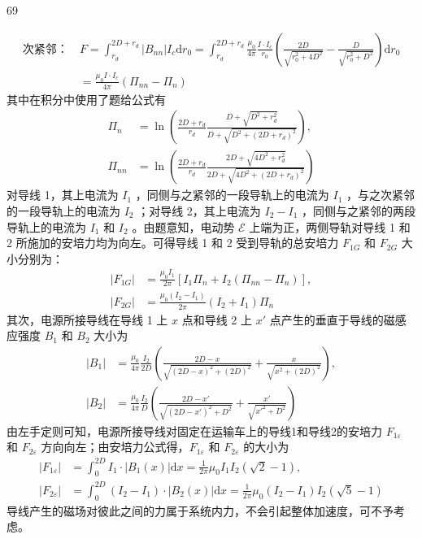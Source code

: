 \begin{solution}{69}
\begin{subsolution}
\begin{align}
            \text{次紧邻：} &\ F = \int_{r_{d}}^{2D+r_{d}} |B_{nn}| I_{c} \mathrm{d}r_{0} = \int_{r_{d}}^{2D+r_{d}} \frac{\mu_{0}}{4\pi} \frac{I \cdot I_{c}}{r_{0}} \left( \frac{2D}{\sqrt{r_{0}^{2} + 4D^{2}}} - \frac{D}{\sqrt{r_{0}^{2} + D^{2}}} \right) \mathrm{d}r_{0} \nonumber \\
            &\ = \frac{\mu_{0} I \cdot I_{c}}{4\pi} (\Pi_{nn} - \Pi_{n}) \label{eq:16.p69}
        \end{align}
        其中在积分中使用了题给公式有
        \begin{align}
            \Pi_{n} &= \ln\left( \frac{2D + r_{d}}{r_{d}} \frac{D + \sqrt{D^{2} + r_{d}^{2}}}{D + \sqrt{D^{2} + (2D + r_{d})^{2}}} \right), \nonumber \\
            \Pi_{nn} &= \ln\left( \frac{2D + r_{d}}{r_{d}} \frac{2D + \sqrt{4D^{2} + r_{d}^{2}}}{2D + \sqrt{4D^{2} + (2D + r_{d})^{2}}} \right)
        \end{align}
        对导线 1，其上电流为 $I_{1}$ ，同侧与之紧邻的一段导轨上的电流为 $I_{1}$ ，与之次紧邻的一段导轨上的电流为 $I_{2}$ ；对导线 2，其上电流为 $I_{2}-I_{1}$ ，同侧与之紧邻的两段导轨上的电流为 $I_{1}$ 和 $I_{2}$ 。由题意知，电动势 $\mathcal{E}$ 上端为正，两侧导轨对导线 1 和 2 所施加的安培力均为向左。可得导线 1 和 2 受到导轨的总安培力 $F_{1G}$ 和 $F_{2G}$ 大小分别为：
        \begin{align}
            |F_{1G}| &= \frac{\mu_{0} I_{1}}{2\pi} \left[ I_{1} \Pi_{n} + I_{2} (\Pi_{nn} - \Pi_{n}) \right], \nonumber \\
            |F_{2G}| &= \frac{\mu_{0} (I_{2} - I_{1})}{2\pi} (I_{2} + I_{1}) \Pi_{n} \label{eq:17.p69}
        \end{align}
        其次，电源所接导线在导线 1 上 $x$ 点和导线 2 上 $x'$ 点产生的垂直于导线的磁感应强度 $B_{1}$ 和 $B_{2}$ 大小为
        \begin{align}
            |B_{1}| &= \frac{\mu_{0}}{4\pi} \frac{I_{2}}{2D} \left( \frac{2D - x}{\sqrt{(2D - x)^{2} + (2D)^{2}}} + \frac{x}{\sqrt{x^{2} + (2D)^{2}}} \right), \nonumber \\
            |B_{2}| &= \frac{\mu_{0}}{4\pi} \frac{I_{2}}{D} \left( \frac{2D - x'}{\sqrt{(2D - x')^{2} + D^{2}}} + \frac{x'}{\sqrt{x'^{2} + D^{2}}} \right) \label{eq:18.p69}
        \end{align}
        由左手定则可知，电源所接导线对固定在运输车上的导线1和导线2的安培力 $F_{1\varepsilon}$ 和 $F_{2\varepsilon}$ 方向向左；由安培力公式得，$F_{1\varepsilon}$ 和 $F_{2\varepsilon}$ 的大小为
        \begin{align}
            |F_{1\varepsilon}| &= \int_{0}^{2D} I_{1} \cdot |B_{1}(x)| \mathrm{d}x = \frac{1}{2\pi} \mu_{0} I_{1} I_{2} (\sqrt{2} - 1), \nonumber \\
            |F_{2\varepsilon}| &= \int_{0}^{2D} (I_{2} - I_{1}) \cdot |B_{2}(x)| \mathrm{d}x = \frac{1}{2\pi} \mu_{0} (I_{2} - I_{1}) I_{2} (\sqrt{5} - 1) \label{eq:19.p69}
        \end{align}
        导线产生的磁场对彼此之间的力属于系统内力，不会引起整体加速度，可不予考虑。


\end{subsolution}
\end{solution}

